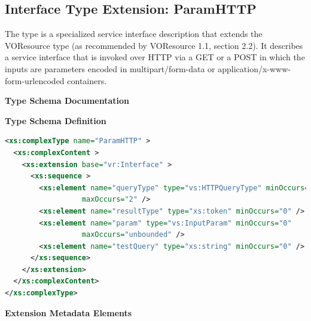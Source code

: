 \documentclass[11pt,a4paper]{ivoa}
\begin{document}
\subsection{Interface Type Extension: ParamHTTP}
\label{sect:paramif}


The  type is a specialized service interface
description that extends the VOResource  type 
(as recommended by VOResource 1.1, section 2.2).  It
describes a service interface that is invoked over HTTP via a GET or a
POST in which the inputs are parameters
encoded in multipart/form-data or application/x-www-form-urlencoded
containers.

\begin{generated}
\begingroup
      	\renewcommand*\descriptionlabel[1]{%
      	\hbox to 5.5em{\emph{#1}\hfil}}\vspace{2ex}\noindent\textbf{ Type Schema Documentation}



\vspace{1ex}\noindent\textbf{ Type Schema Definition}

\begin{lstlisting}[language=XML,basicstyle=\footnotesize]
<xs:complexType name="ParamHTTP" >
  <xs:complexContent >
    <xs:extension base="vr:Interface" >
      <xs:sequence >
        <xs:element name="queryType" type="vs:HTTPQueryType" minOccurs="0"
                  maxOccurs="2" />
        <xs:element name="resultType" type="xs:token" minOccurs="0" />
        <xs:element name="param" type="vs:InputParam" minOccurs="0"
                  maxOccurs="unbounded" />
        <xs:element name="testQuery" type="xs:string" minOccurs="0" />
      </xs:sequence>
    </xs:extension>
  </xs:complexContent>
</xs:complexType>
\end{lstlisting}

\vspace{0.5ex}\noindent\textbf{ Extension Metadata Elements}


\end{generated}
\end{document}
